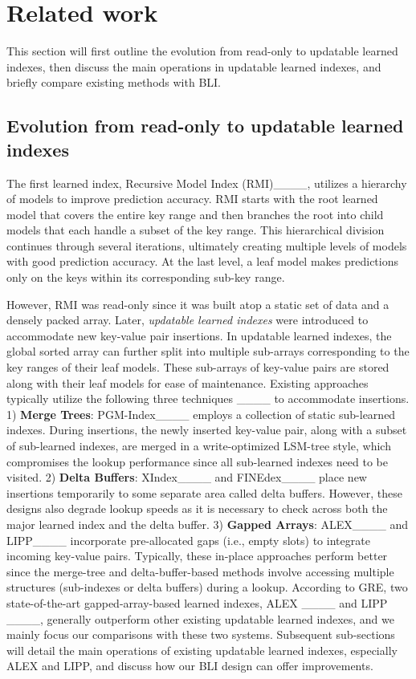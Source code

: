 \section{Related work \label{sec-realted-work}
}
This section will first outline the evolution from read-only to updatable learned indexes, then discuss the main operations in updatable learned indexes, and briefly compare existing methods with BLI.

\subsection{Evolution from read-only to updatable learned indexes}
The first learned index, Recursive Model Index (RMI)____, utilizes a hierarchy of models to improve prediction accuracy. RMI starts with the root learned model that covers the entire key range and then branches the root into child models that each handle a subset of the key range. This hierarchical division continues through several iterations, ultimately creating multiple levels of models with good prediction accuracy. At the last level, a leaf model makes predictions only on the keys within its corresponding sub-key range.

However, RMI was read-only since it was built atop a static set of data and a densely packed array. Later, \textit{updatable learned indexes} were introduced to accommodate new key-value pair insertions. In updatable learned indexes, the global sorted array can further split into multiple sub-arrays corresponding to the key ranges of their leaf models. These sub-arrays of key-value pairs are stored along with their leaf models for ease of maintenance. Existing approaches typically utilize the following three techniques ____ to accommodate insertions. 1) \textbf{Merge Trees}: PGM-Index____ employs a collection of static sub-learned indexes. During insertions, the newly inserted key-value pair, along with a subset of sub-learned indexes, are merged in a write-optimized LSM-tree style, which compromises the lookup performance since all sub-learned indexes need to be visited. 2) \textbf{Delta Buffers}: XIndex____ and FINEdex____ place new insertions temporarily to some separate area called delta buffers. However, these designs also degrade lookup speeds as it is necessary to check across both the major learned index and the delta buffer. 3) \textbf{Gapped Arrays}: ALEX____ and LIPP____ incorporate pre-allocated gaps (i.e., empty slots) to integrate incoming key-value pairs. Typically, these in-place approaches perform better since the merge-tree and delta-buffer-based methods involve accessing multiple structures (sub-indexes or delta buffers) during a lookup. According to GRE, two state-of-the-art gapped-array-based learned indexes, ALEX ____ and LIPP ____, generally outperform other existing updatable learned indexes, and we mainly focus our comparisons with these two systems. Subsequent sub-sections will detail the main operations of existing updatable learned indexes, especially ALEX and LIPP, and discuss how our BLI design can offer improvements.

